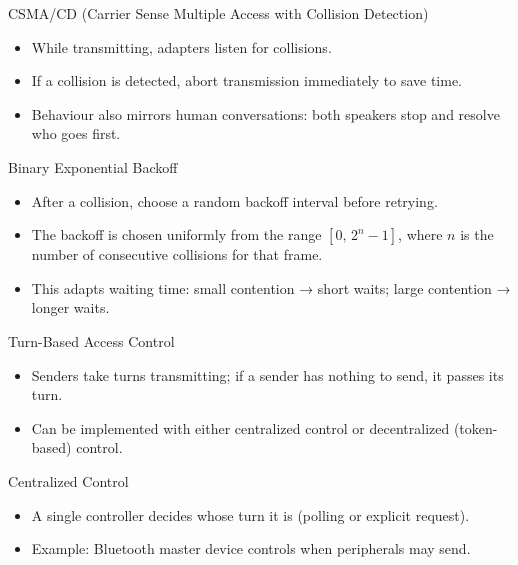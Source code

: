 \begin{definition}
    {CSMA/CD (Carrier Sense Multiple Access with Collision Detection)}
    \begin{itemize}
        \item While transmitting, adapters listen for collisions.
        \item If a collision is detected, abort transmission immediately to save time.
        \item Behaviour also mirrors human conversations: both speakers stop and resolve who goes first.
    \end{itemize}
\end{definition}

\begin{definition}
    {Binary Exponential Backoff}
    \begin{itemize}
        \item After a collision, choose a random backoff interval before retrying.
        \item The backoff is chosen uniformly from the range $[0,\,2^{n}-1]$, where $n$ is the number of consecutive collisions for that frame.
        \item This adapts waiting time: small contention → short waits; large contention → longer waits.
    \end{itemize}
\end{definition}

\begin{definition}
    {Turn-Based Access Control}
    \begin{itemize}
        \item Senders take turns transmitting; if a sender has nothing to send, it passes its turn.
        \item Can be implemented with either centralized control or decentralized (token-based) control.
    \end{itemize}
\end{definition}

\begin{definition}
    {Centralized Control}
    \begin{itemize}
        \item A single controller decides whose turn it is (polling or explicit request).
        \item Example: Bluetooth master device controls when peripherals may send.
    \end{itemize}
\end{definition}

